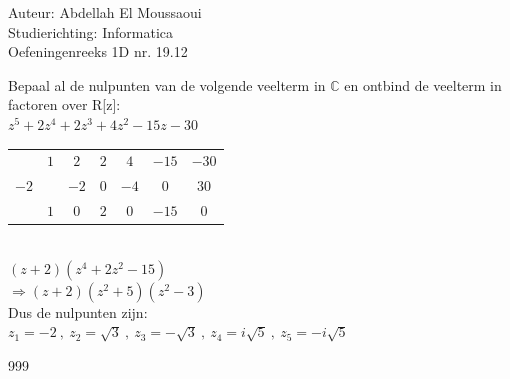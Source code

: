 \documentclass[a4paper]{article}
\begin{document}
  
\noindent \large Auteur: Abdellah El Moussaoui \\
\noindent \large Studierichting: Informatica\\
\noindent \large Oefeningenreeks 1D nr. 19.12\\

\medskip

\normalsize

Bepaal al de nulpunten van de volgende veelterm in $\mathbb{C}$ en ontbind de veelterm in factoren over R[z]: \\

$z^5 + 2z^4 + 2z^3 + 4z^2 - 15z - 30$\\

\begin{tabular}{c|cccccc}
& $1$ & $2$ & $2$ & $4$ & $-15$ & $-30$\\
$-2$ & & $-2$ & $0$ & $-4$ & $0$ & $30$\\ \hline
& $1$ & $0$ & $2$ & $0$ & $-15$ & $0$
\end{tabular}\\

$(z+2)(z^4+2z^2-15)$\\

$\Rightarrow (z+2)(z^2+5)(z^2-3)$\\

Dus de nulpunten zijn:\\

$\boxed{z_1 = -2\ ,\ z_2 = \sqrt{3}\ ,\ z_3 = -\sqrt{3}\ ,\ z_4 = i\sqrt{5}\ ,\ z_5 = -i\sqrt{5}}$\\


\begin{thebibliography}{999}
\end{thebibliography}
\end{document}
